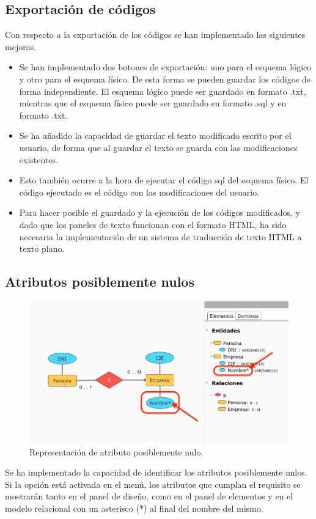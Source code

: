 \subsection{Exportación de códigos}
Con respecto a la exportación de los códigos se han implementado las siguientes mejoras.

\begin{itemize}
    \item Se han implementado dos botones de exportación: uno para el esquema lógico y otro para el esquema físico. De esta forma se pueden guardar los códigos de forma independiente. El esquema lógico puede ser guardado en formato .txt, mientras que el esquema físico puede ser guardado en formato .sql y en formato .txt.
    \item Se ha añadido la capacidad de guardar el texto modificado escrito por el usuario, de forma que al guardar el texto se guarda con las modificaciones existentes.
    \item Esto también ocurre a la hora de ejecutar el código sql del esquema físico. El código ejecutado es el código con las modificaciones del usuario.
    \item Para hacer posible el guardado y la ejecución de los códigos modificados, y dado que los paneles de texto funcionan con el formato HTML, ha sido necesaria la implementación de un sistema de traducción de texto HTML a texto plano.
\end{itemize}
\subsection{Atributos posiblemente nulos}
\begin{figure}[H]
    \centering
    \includegraphics[width=\textwidth]{img/nulls.png}
    \caption{Representación de atributo posiblemente nulo.}
\end{figure}
Se ha implementado la capacidad de identificar los atributos posiblemente nulos. Si la opción está activada en el menú, los atributos que cumplan el requisito se mostrarán tanto en el panel de diseño, como en el panel de elementos y en el modelo relacional con un asterisco (*) al final del nombre del mismo.
